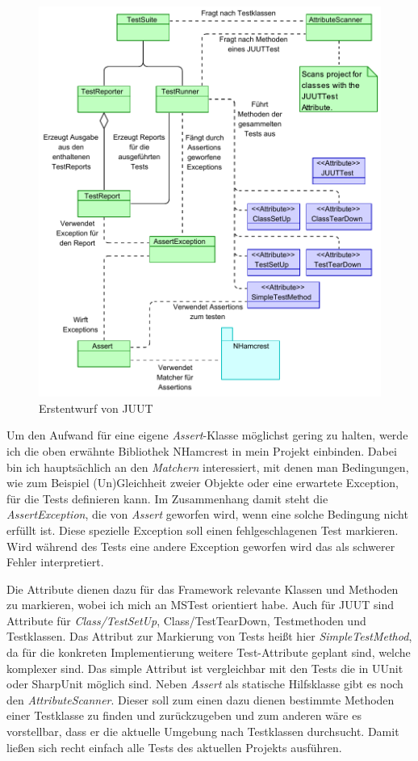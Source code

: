 \begin{figure}
\centering
\includegraphics[width=0.9\linewidth]{images/Kapitel_ErstentwurfDesFrameworks/WalkingSkeleton}
\caption[Erstentwurf von JUUT]{Erstentwurf von JUUT}
\label{fig:WalkingSkeleton}
\end{figure}
\clearpage

Um den Aufwand für eine eigene \textit{Assert}-Klasse möglichst gering zu halten, werde ich die oben erwähnte Bibliothek NHamcrest in mein Projekt einbinden. Dabei bin ich hauptsächlich an den \textit{Matchern} interessiert, mit denen man Bedingungen, wie zum Beispiel (Un)Gleichheit zweier Objekte oder eine erwartete Exception, für die Tests definieren kann. Im Zusammenhang damit steht die \textit{AssertException}, die von \textit{Assert} geworfen wird, wenn eine solche Bedingung nicht erfüllt ist. Diese spezielle Exception soll einen fehlgeschlagenen Test markieren. Wird während des Tests eine andere Exception geworfen wird das als schwerer Fehler interpretiert.

Die Attribute dienen dazu für das Framework relevante Klassen und Methoden zu markieren, wobei ich mich an MSTest orientiert habe. Auch für JUUT sind Attribute für \textit{Class/TestSetUp}, {Class/TestTearDown}, Testmethoden und Testklassen. Das Attribut zur Markierung von Tests heißt hier \textit{SimpleTestMethod}, da für die konkreten Implementierung weitere Test-Attribute geplant sind, welche komplexer sind. Das simple Attribut ist vergleichbar mit den Tests die in UUnit oder SharpUnit möglich sind.
Neben \textit{Assert} als statische Hilfsklasse gibt es noch den \textit{AttributeScanner}. Dieser soll zum einen dazu dienen bestimmte Methoden einer Testklasse zu finden und zurückzugeben und zum anderen wäre es vorstellbar, dass er die aktuelle Umgebung nach Testklassen durchsucht. Damit ließen sich recht einfach alle Tests des aktuellen Projekts ausführen.

